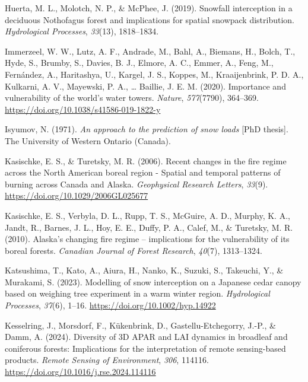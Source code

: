 \documentclass[
  letterpaper,
]{tex/uofsthesis-cs}
\newlength{\cslhangindent}
\newenvironment{CSLReferences}[2] %
 {\begin{list}{}{%
  \setlength{\itemindent}{0pt}
  \setlength{\leftmargin}{0pt}
  \setlength{\parsep}{0pt}
  \ifodd #1
   \setlength{\leftmargin}{\cslhangindent}
   \setlength{\itemindent}{-1\cslhangindent}
  \fi
  \setlength{\itemsep}{#2\baselineskip}}}
 {\end{list}}
\begin{document}
\begin{CSLReferences}{1}{0}
Huerta, M. L., Molotch, N. P., \& McPhee, J. (2019). Snowfall
interception in a deciduous {Nothofagus} forest and implications for
spatial snowpack distribution. \emph{Hydrological Processes},
\emph{33}(13), 1818--1834.

Immerzeel, W. W., Lutz, A. F., Andrade, M., Bahl, A., Biemans, H.,
Bolch, T., Hyde, S., Brumby, S., Davies, B. J., Elmore, A. C., Emmer,
A., Feng, M., Fernández, A., Haritashya, U., Kargel, J. S., Koppes, M.,
Kraaijenbrink, P. D. A., Kulkarni, A. V., Mayewski, P. A., \ldots{}
Baillie, J. E. M. (2020). Importance and vulnerability of the world's
water towers. \emph{Nature}, \emph{577}(7790), 364--369.
\url{https://doi.org/10.1038/s41586-019-1822-y}

Isyumov, N. (1971). \emph{An approach to the prediction of snow loads}
{[}PhD thesis{]}. The University of Western Ontario (Canada).

Kasischke, E. S., \& Turetsky, M. R. (2006). Recent changes in the fire
regime across the {North American} boreal region - {Spatial} and
temporal patterns of burning across {Canada} and {Alaska}.
\emph{Geophysical Research Letters}, \emph{33}(9).
\url{https://doi.org/10.1029/2006GL025677}

Kasischke, E. S., Verbyla, D. L., Rupp, T. S., McGuire, A. D., Murphy,
K. A., Jandt, R., Barnes, J. L., Hoy, E. E., Duffy, P. A., Calef, M., \&
Turetsky, M. R. (2010). Alaska's changing fire regime -- implications
for the vulnerability of its boreal forests. \emph{Canadian Journal of
Forest Research}, \emph{40}(7), 1313--1324.

Katsushima, T., Kato, A., Aiura, H., Nanko, K., Suzuki, S., Takeuchi,
Y., \& Murakami, S. (2023). Modelling of snow interception on a
{Japanese} cedar canopy based on weighing tree experiment in a warm
winter region. \emph{Hydrological Processes}, \emph{37}(6), 1--16.
\url{https://doi.org/10.1002/hyp.14922}

Kesselring, J., Morsdorf, F., Kükenbrink, D., Gastellu-Etchegorry,
J.-P., \& Damm, A. (2024). Diversity of {3D APAR} and {LAI} dynamics in
broadleaf and coniferous forests: {Implications} for the interpretation
of remote sensing-based products. \emph{Remote Sensing of Environment},
\emph{306}, 114116. \url{https://doi.org/10.1016/j.rse.2024.114116}


\end{CSLReferences}
\end{document}
